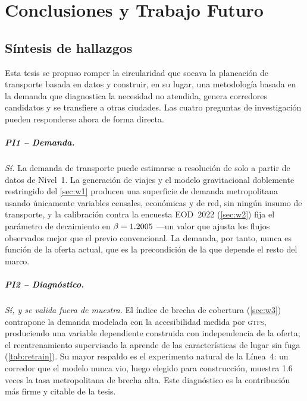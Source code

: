 \chapter{Conclusiones y Trabajo Futuro}
\label{ch:conclusiones}

\section{Síntesis de hallazgos}
\label{sec:concl-sintesis}

Esta tesis se propuso romper la circularidad que socava la planeación de transporte
basada en datos y construir, en su lugar, una metodología basada en la demanda que
diagnostica la necesidad no atendida, genera corredores candidatos y se transfiere a
otras ciudades. Las cuatro preguntas de investigación pueden responderse ahora de forma
directa.

\paragraph{PI1 -- Demanda.} \emph{Sí.} La demanda de transporte puede estimarse a
resolución de \ageb solo a partir de datos de Nivel~1. La generación de viajes y el modelo
gravitacional doblemente restringido del \cref{sec:w1} producen una superficie de demanda
metropolitana usando únicamente variables censales, económicas y de red, sin ningún insumo
de transporte, y la calibración contra la encuesta EOD~2022 (\cref{sec:w2}) fija el
parámetro de decaimiento en $\beta=1.2005$ ---un valor que ajusta los flujos
observados mejor que el previo convencional. La demanda, por tanto, nunca es función de la
oferta actual, que es la precondición de la que depende el resto del marco.

\paragraph{PI2 -- Diagnóstico.} \emph{Sí, y se valida fuera de muestra.} El índice de
brecha de cobertura (\cref{sec:w3}) contrapone la demanda modelada con la accesibilidad
medida por \textsc{gtfs}, produciendo una variable dependiente construida con independencia
de la oferta; el reentrenamiento supervisado la aprende de las características de lugar sin
fuga (\cref{tab:retrain}). Su mayor respaldo es el experimento natural de la Línea~4: un
corredor que el modelo nunca vio, luego elegido para construcción, muestra \num{1.6} veces
la tasa metropolitana de brecha alta. Este diagnóstico es la contribución más firme y
citable de la tesis.

